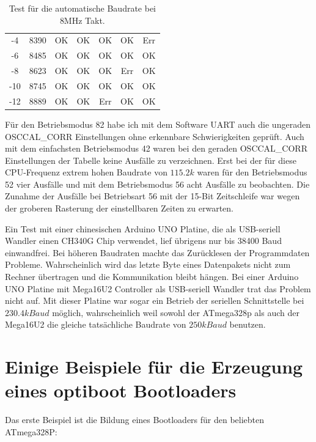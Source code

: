 \begin{table}[H]
\begin{center}
\begin{tabular}{| c | c || c | c || c | c | c |}
    \hline
    -4     &  8390   &  OK       &   OK    &  OK     &  OK     &   Err \\
    -6     &  8485   &  OK       &   OK    &  OK     &  OK     &   OK  \\
    \hline
    -8     &  8623   &  OK       &   OK    &  OK     &  Err    &   OK  \\
    -10    &  8745   &  OK       &   OK    &  OK     &  OK     &   OK  \\
    -12    &  8889   &  OK       &   OK    &  Err    &  OK     &   OK  \\
    \hline
    \end{tabular}
  \end{center}
  \caption{Test für die automatische Baudrate bei 8MHz Takt.}
  \label{tab:AutoBaudTest8}
\end{table}


Für den Betriebsmodus 82 habe ich mit dem Software UART
auch die ungeraden OSCCAL\_CORR Einstellungen ohne erkennbare Schwierigkeiten geprüft.
Auch mit dem einfachsten Betriebsmodus 42 waren bei den geraden OSCCAL\_CORR
Einstellungen der Tabelle keine Ausfälle zu verzeichnen.
Erst bei der für diese CPU-Frequenz extrem hohen Baudrate von \(115.2k\) waren 
für den Betriebsmodus 52 vier Ausfälle und mit dem Betriebsmodus 56 acht Ausfälle
zu beobachten. Die Zunahme der Ausfälle bei Betriebsart 56 mit der 15-Bit Zeitschleife war
wegen der groberen Rasterung der einstellbaren Zeiten zu erwarten.

Ein Test mit einer chinesischen Arduino UNO Platine, die als USB-seriell Wandler einen
CH340G Chip verwendet, lief übrigens nur bis 38400 Baud einwandfrei.
Bei höheren Baudraten machte das Zurücklesen der Programmdaten Probleme.
Wahrscheinlich wird das letzte Byte eines Datenpakets nicht zum Rechner übertragen und
die Kommunikation bleibt hängen. Bei einer Arduino UNO Platine mit Mega16U2 Controller
als USB-seriell Wandler trat das Problem nicht auf. Mit dieser Platine war sogar
ein Betrieb der seriellen Schnittstelle bei \(230.4kBaud\) möglich, wahrscheinlich
weil sowohl der ATmega328p als auch der Mega16U2 die gleiche tatsächliche Baudrate
von \(250kBaud\) benutzen.


\section{Einige Beispiele für die Erzeugung eines optiboot Bootloaders}

Das erste Beispiel ist die Bildung eines Bootloaders für den beliebten ATmega328P:

